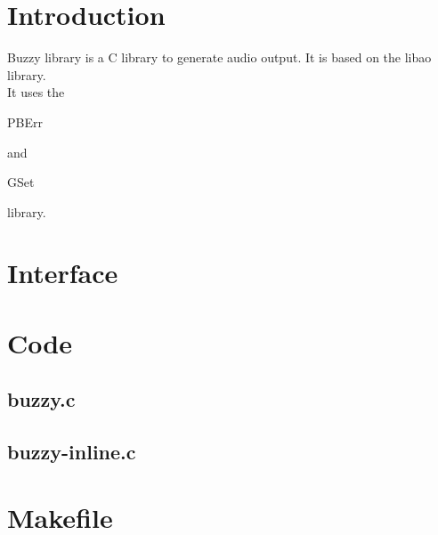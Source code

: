 \section*{Introduction}

Buzzy library is a C library to generate audio output. It is based on the libao library.\\

It uses the \begin{ttfamily}PBErr\end{ttfamily} and \begin{ttfamily}GSet\end{ttfamily} library.\\

\section{Interface}

\begin{scriptsize}
\begin{ttfamily}

\end{ttfamily}
\end{scriptsize}

\section{Code}

\subsection{buzzy.c}

\begin{scriptsize}
\begin{ttfamily}

\end{ttfamily}
\end{scriptsize}

\subsection{buzzy-inline.c}

\begin{scriptsize}
\begin{ttfamily}

\end{ttfamily}
\end{scriptsize}

\section{Makefile}

